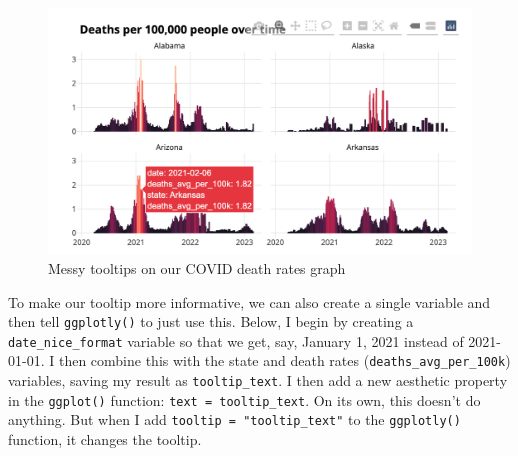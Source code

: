 \documentclass[
]{book}
\begin{document}
\begin{figure}
\includegraphics[width=1\linewidth]{assets/covid-website-messy-tooltips} \caption{Messy tooltips on our COVID death rates graph}\label{fig:covid-website-messy-tooltips}
\end{figure}

To make our tooltip more informative, we can also create a single variable and then tell \texttt{ggplotly()} to just use this. Below, I begin by creating a \texttt{date\_nice\_format} variable so that we get, say, January 1, 2021 instead of 2021-01-01. I then combine this with the state and death rates (\texttt{deaths\_avg\_per\_100k}) variables, saving my result as \texttt{tooltip\_text}. I then add a new aesthetic property in the \texttt{ggplot()} function: \texttt{text\ =\ tooltip\_text}. On its own, this doesn't do anything. But when I add \texttt{tooltip\ =\ "tooltip\_text"} to the \texttt{ggplotly()} function, it changes the tooltip.
\end{document}
